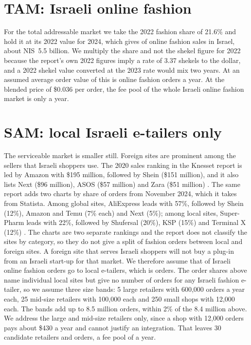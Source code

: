 \section{TAM: Israeli online fashion}\label{sec:tam}

For the total addressable market we take the 2022 fashion share of 21.6\% and hold it at its 2022 value for 2024, which gives  of online fashion sales in Israel, about NIS~5.5 billion. We multiply the share and not the shekel figure for 2022 because the report's own 2022 figures imply a rate of 3.37 shekels to the dollar, and a 2022 shekel value converted at the 2023 rate would mix two years. At an assumed average order value of  this is  online fashion orders a year. At the blended price of \$0.036 per order, the fee pool of the whole Israeli online fashion market is only  a year.

\section{SAM: local Israeli e-tailers only}\label{sec:sam}

The serviceable market is smaller still. Foreign sites are prominent among the sellers that Israeli shoppers use. The 2020 sales ranking in the Knesset report is led by Amazon with \$195 million, followed by Shein (\$151 million), and it also lists Next (\$96 million), ASOS (\$57 million) and Zara (\$51 million) \cite{knesset_ric2025}. The same report adds two charts by share of orders from November 2024, which it takes from Statista. Among global sites, AliExpress leads with 57\%, followed by Shein (12\%), Amazon and Temu (7\% each) and Next (5\%); among local sites, Super-Pharm leads with 22\%, followed by Shufersal (20\%), KSP (15\%) and Terminal X (12\%) \cite{knesset_ric2025}. The charts are two separate rankings and the report does not classify the sites by category, so they do not give a split of fashion orders between local and foreign sites. A foreign site that serves Israeli shoppers will not buy a plug-in from an Israeli start-up for that market. We therefore assume that  of Israeli online fashion orders go to local e-tailers, which is  orders. The order shares above name individual local sites but give no number of orders for any Israeli fashion e-tailer, so we assume three size bands: 5 large retailers with 600,000 orders a year each, 25 mid-size retailers with 100,000 each and 250 small shops with 12,000 each. The bands add up to 8.5 million orders, within 2\% of the 8.4 million above. We address the large and mid-size retailers only, since a shop with 12,000 orders pays about \$430 a year and cannot justify an integration. That leaves 30 candidate retailers and  orders, a fee pool of  a year.

